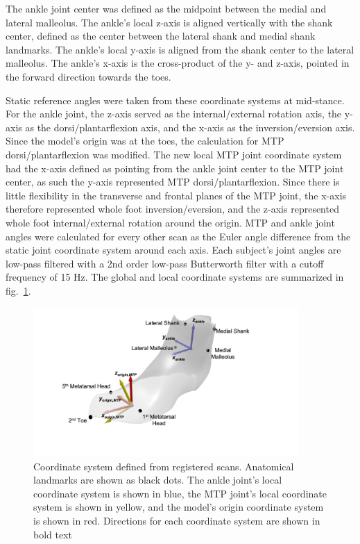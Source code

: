 \documentclass[defaultstyle,11pt]{thesis}
\begin{document}
The ankle joint center was defined as the midpoint between the medial and lateral malleolus.
The ankle's local z-axis is aligned vertically with the shank center, defined as the center between the lateral shank and medial shank landmarks.
The ankle's local y-axis is aligned from the shank center to the lateral malleolus.
The ankle's x-axis is the cross-product of the y- and z-axis, pointed in the forward direction towards the toes.

Static reference angles were taken from these coordinate systems at mid-stance.
For the ankle joint, the z-axis served as the internal/external rotation axis, the y-axis as the dorsi/plantarflexion axis, and the x-axis as the inversion/eversion axis.
Since the model's origin was at the toes, the calculation for MTP dorsi/plantarflexion was modified.
The new local MTP joint coordinate system had the x-axis defined as pointing from the ankle joint center to the MTP joint center, as such the y-axis represented MTP dorsi/plantarflexion.
Since there is little flexibility in the transverse and frontal planes of the MTP joint, the x-axis therefore represented whole foot inversion/eversion, and the z-axis represented whole foot internal/external rotation around the origin.
MTP and ankle joint angles were calculated for every other scan as the Euler angle difference from the static joint coordinate system around each axis.
Each subject's joint angles are low-pass filtered with a 2nd order low-pass Butterworth filter with a cutoff frequency of 15 Hz.
The global and local coordinate systems are summarized in fig.~\ref{fig:SA2-angles}.

\hypertarget{fig:SA2-angles}{%
\begin{figure}
\centering
\includegraphics[width=0.9\textwidth,height=\textheight]{../fig/SA2/foot_cord.png}
\caption[{Coordinate system defined from registered scans.}]{Coordinate system defined from registered scans. Anatomical landmarks are shown as black dots. The ankle joint's local coordinate system is shown in blue, the MTP joint's local coordinate system is shown in yellow, and the model's origin coordinate system is shown in red. Directions for each coordinate system are shown in bold text}
\label{fig:SA2-angles}
\end{figure}
}
\end{document}
